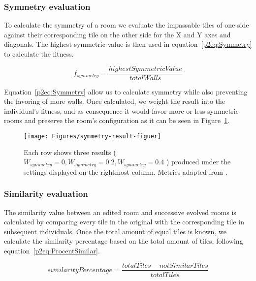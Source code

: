 \subsubsection{Symmetry evaluation}


To calculate the symmetry of a room we evaluate the impassable tiles of one side against their corresponding tile on the other side for the X and Y axes and diagonals. The highest symmetric value is then used in equation~\ref{p2eq:Symmetry} to calculate the fitness.

\begin{equation} \label{p2eq:Symmetry}
f_{symmetry} = \frac{highestSymmetricValue} {totalWalls}
\end{equation}

Equation~\ref{p2eq:Symmetry} allow us to calculate symmetry while also preventing the favoring of more walls. Once calculated, we weight the result into the individual's fitness, and as consequence it would favor more or less symmetric rooms and preserve the room's configuration as it can be seen in Figure~\ref{p2fig:symmetry-result}.

\begin{figure}
\texttt{[image: Figures/symmetry-result-figuer]}
\caption{Each row shows three results (\(W_{symmetry}=0, W_{symmetry}=0.2, W_{symmetry}=0.4\) ) produced under the settings displayed on the rightmost column. Metrics adapted from \cite{Baldwin2017Mixed-initiativePatterns}.}
\label{p2fig:symmetry-result}
\end{figure}

\subsubsection{Similarity evaluation}

The similarity value between an edited room and successive evolved rooms is calculated by comparing every tile in the original with the corresponding tile in subsequent individuals. Once the total amount of equal tiles is known, we calculate the similarity percentage based on the total amount of tiles, following equation~\ref{p2eq:ProcentSimilar}. 

\begin{equation} \label{p2eq:ProcentSimilar}
similarityPercentage = \frac{totalTiles - notSimilarTiles} {totalTiles}
\end{equation}

